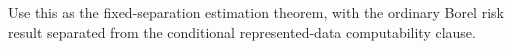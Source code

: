 Use this as the fixed-separation estimation theorem, with the ordinary Borel risk result separated from the conditional represented-data computability clause.